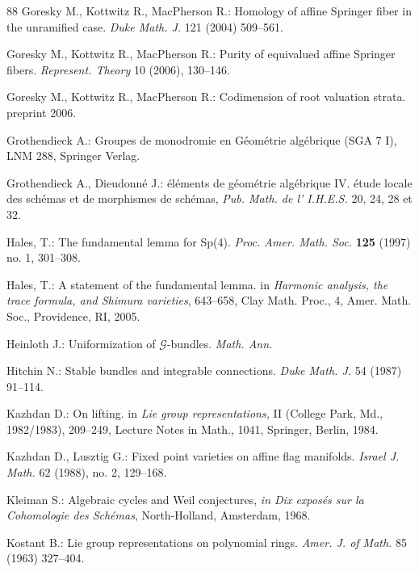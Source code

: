 \documentclass[12pt,english]{smfart}
\numberwithin{equation}{subsection}
\theoremstyle{remark}
\begin{document}
\begin{thebibliography}{88}
 Goresky M., Kottwitz R., MacPherson R.:
{Homology of affine Springer fiber in the unramified case}. {\em
Duke Math. J.} 121 (2004) 509--561.

  Goresky M., Kottwitz R., MacPherson R.:
Purity of equivalued affine Springer fibers.  {\em Represent.
Theory} 10 (2006), 130--146.

 Goresky M., Kottwitz R., MacPherson R.:
{Codimension of root valuation strata}. preprint 2006.

 Grothendieck A.: Groupes de monodromie en G\'eom\'etrie alg\'ebrique (SGA 7 I), {\rm LNM} 288, Springer Verlag.

 Grothendieck A., Dieudonn\'e J.: \'el\'ements de
    g\'eom\'etrie
    alg\'ebrique IV. \'etude locale des sch\'emas et de morphismes de sch\'emas,
    {\em Pub. Math. de l' I.H.E.S.} 20, 24, 28 et 32.

 Hales, T.: The fundamental lemma for Sp(4).
\emph{Proc. Amer. Math. Soc.} \textbf{125} (1997) no. 1, 301--308.

 Hales, T.: {A statement of the fundamental lemma}. in {\em
 Harmonic analysis, the trace formula, and Shimura varieties},
 643--658, Clay Math. Proc., 4, Amer. Math. Soc., Providence, RI,
 2005.

 Heinloth J.: {Uniformization of $\mathcal{G}$-bundles}. {\em Math. Ann.}

 Hitchin N.: {Stable bundles and integrable
connections}. {\em Duke Math. J.} 54 (1987) 91--114.

 Kazhdan D.: On lifting. in {\em Lie group representations,} II
(College Park, Md., 1982/1983),  209--249, Lecture Notes in Math.,
1041, Springer, Berlin, 1984.

 Kazhdan D., Lusztig G.: Fixed point varieties on affine
flag manifolds. {\em Israel J. Math.}  62  (1988),  no. 2, 129--168.

 Kleiman S.: {Algebraic cycles and Weil conjectures}, {\em in
    Dix expos\'es sur la Cohomologie des Sch\'emas}, North-Holland, Amsterdam, 1968.

 Kostant B.: {Lie group representations on
polynomial rings}. {\em Amer. J. of Math.} 85 (1963) 327--404.


\end{thebibliography}
\end{document}
